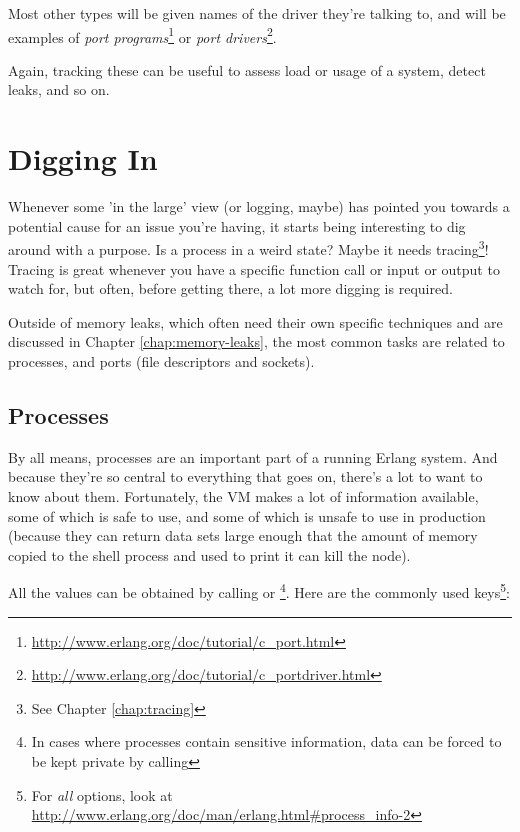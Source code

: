 \documentclass[11pt, oneside]{book}   	%
\begin{document}
Most other types will be given names of the driver they're talking to, and will be examples of \emph{port programs}\footnote{\href{http://www.erlang.org/doc/tutorial/c\_port.html}{http://www.erlang.org/doc/tutorial/c\_port.html}} or \emph{port drivers}\footnote{\href{http://www.erlang.org/doc/tutorial/c\_portdriver.html}{http://www.erlang.org/doc/tutorial/c\_portdriver.html}}.

Again, tracking these can be useful to assess load or usage of a system, detect leaks, and so on.

\section{Digging In}
\label{sec:digging-in}

Whenever some 'in the large' view (or logging, maybe) has pointed you towards a potential cause for an issue you're having, it starts being interesting to dig around with a purpose. Is a process in a weird state? Maybe it needs tracing\footnote{See Chapter \ref{chap:tracing}}! Tracing is great whenever you have a specific function call or input or output to watch for, but often, before getting there, a lot more digging is required.

Outside of memory leaks, which often need their own specific techniques and are discussed in Chapter \ref{chap:memory-leaks}, the most common tasks are related to processes, and ports (file descriptors and sockets).

\subsection{Processes}
\label{subsec:digging-procs}

By all means, processes are an important part of a running Erlang system. And because they're so central to everything that goes on, there's a lot to want to know about them. Fortunately, the VM makes a lot of information available, some of which is safe to use, and some of which is unsafe to use in production (because they can return data sets large enough that the amount of memory copied to the shell process and used to print it can kill the node).

All the values can be obtained by calling  or \newline {}\footnote{In cases where processes contain sensitive information, data can be forced to be kept private by calling }. Here are the commonly used keys\footnote{For \emph{all} options, look at \href{http://www.erlang.org/doc/man/erlang.html\#process\_info-2}{http://www.erlang.org/doc/man/erlang.html\#process\_info-2}}:
\end{document}
